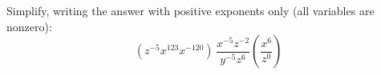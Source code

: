Simplify, writing the answer with positive exponents only (all variables are nonzero):
\[
(z^{-5}x^{123}x^{-120})\,\dfrac{x^{-5}z^{-2}}{y^{-5}z^6}\left(\dfrac{x^6}{z^0}\right)
\]
